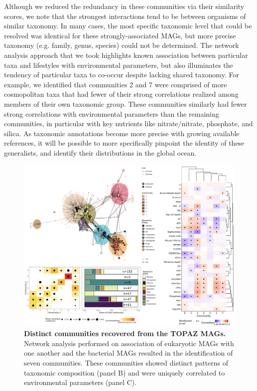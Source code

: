 \documentclass[12pt]{article}
\numberwithin{equation}{section}
\begin{document}
Although we reduced the redundancy in these communities via their similarity scores, we note that the strongest interactions tend to be between organisms of similar taxonomy. In many cases, the most specific taxonomic level that could be resolved was identical for these strongly-associated MAGs, but more precise taxonomy (e.g. family, genus, species) could not be determined. The network analysis approach that we took highlights known association between particular taxa and lifestyles with environmental parameters, but also illuminates the tendency of particular taxa to co-occur despite lacking shared taxonomy. For example, we identified that communities 2 and 7 were comprised of more cosmopolitan taxa that had fewer of their strong correlations realized among members of their own taxonomic group. These communities similarly had fewer strong correlations with environmental parameters than the remaining communities, in particular with key nutrients like nitrate/nitrate, phosphate, and silica. As taxonomic annotations become more precise with growing available references, it will be possible to more specifically pinpoint the identity of these generalists, and identify their distributions in the global ocean. 

\begin{figure}[h!]    %
    \centering
    \includegraphics[width = \columnwidth]{figures/Figure6_Networks.png}
    \caption{ \textbf{Distinct communities recovered from the TOPAZ MAGs.} Network analysis performed on association of eukaryotic MAGs with one another and the bacterial MAGs resulted in the identification of seven communities. These communities showed distinct patterns of taxonomic composition (panel B) and were uniquely correlated to environmental parameters (panel C).}
    \label{fig:fig4-trophy}
\end{figure}
\end{document}
